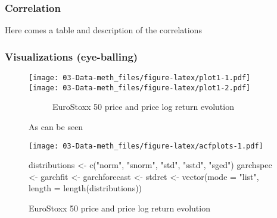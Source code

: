 \documentclass[a4paper,nobind]{templates/ociamthesis}
\newenvironment{Shaded}{\begin{snugshade}}{\end{snugshade}}
\newcommand{\AttributeTok}[1]{\textcolor[rgb]{0.77,0.63,0.00}{#1}}
\newcommand{\FunctionTok}[1]{\textcolor[rgb]{0.00,0.00,0.00}{#1}}
\newcommand{\NormalTok}[1]{#1}
\newcommand{\OtherTok}[1]{\textcolor[rgb]{0.56,0.35,0.01}{#1}}
\newcommand{\StringTok}[1]{\textcolor[rgb]{0.31,0.60,0.02}{#1}}
\renewenvironment{Shaded}
{
  \vspace{10pt}%
  \begin{snugshade}%
}{%
  \end{snugshade}%
  \vspace{8pt}%
}
\begin{document}
\hypertarget{correlation}{%
\subsubsection{Correlation}\label{correlation}}

Here comes a table and description of the correlations

\hypertarget{visualizations-eye-balling}{%
\subsubsection{Visualizations (eye-balling)}\label{visualizations-eye-balling}}

\begin{figure}[h]

\texttt{[image: 03-Data-meth\_files/figure-latex/plot1-1.pdf]} \texttt{[image: 03-Data-meth\_files/figure-latex/plot1-2.pdf]}

\begin{figure}
\caption{EuroStoxx 50 price and price log return evolution}\label{fig:plot2}
\end{figure}

As can be seen

\texttt{[image: 03-Data-meth\_files/figure-latex/acfplots-1.pdf]}

\begin{Shaded}
\begin{Highlighting}[]
\NormalTok{distributions }\OtherTok{\textless{}{-}} \FunctionTok{c}\NormalTok{(}\StringTok{"norm"}\NormalTok{, }\StringTok{"snorm"}\NormalTok{, }\StringTok{"std"}\NormalTok{, }\StringTok{"sstd"}\NormalTok{, }\StringTok{"sged"}\NormalTok{)}
\NormalTok{garchspec }\OtherTok{\textless{}{-}}\NormalTok{ garchfit }\OtherTok{\textless{}{-}}\NormalTok{ garchforecast }\OtherTok{\textless{}{-}}\NormalTok{ stdret }\OtherTok{\textless{}{-}} \FunctionTok{vector}\NormalTok{(}\AttributeTok{mode =} \StringTok{"list"}\NormalTok{, }\AttributeTok{length =} \FunctionTok{length}\NormalTok{(distributions))}


\end{Highlighting}
\end{Shaded}
\end{figure}
\end{document}
